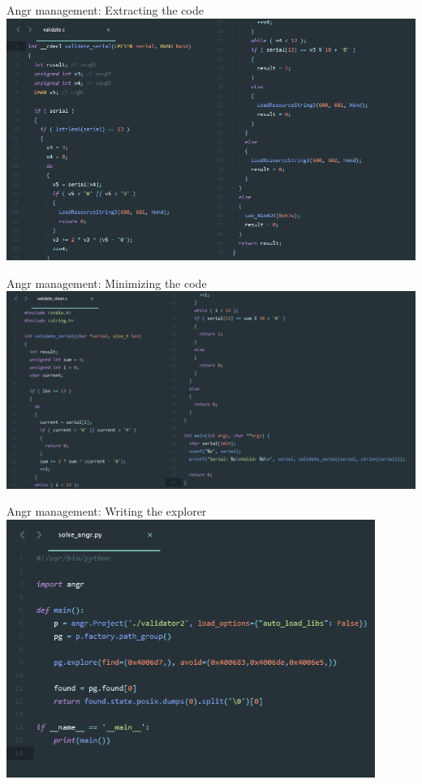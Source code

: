 \documentclass[10pt, compress]{beamer}
\begin{document}
\begin{frame}{Angr management: Extracting the code}
	\includegraphics[width=\textwidth]{images/sc1-7-validator-split.png}
\end{frame}

\begin{frame}{Angr management: Minimizing the code}
	\includegraphics[width=\textwidth]{images/sc1-8-validator-clean-split.png}
\end{frame}

\begin{frame}{Angr management: Writing the explorer}
	\includegraphics[width=0.90\textwidth]{images/sc1-9-angr.png}
\end{frame}



\end{document}
